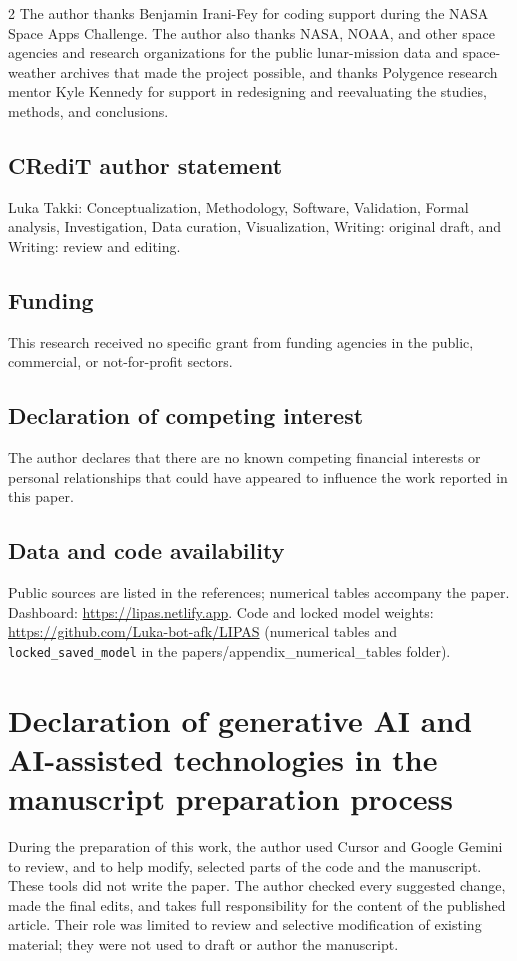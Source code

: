 \begin{multicols}{2}
The author thanks Benjamin Irani-Fey for coding support during the NASA Space Apps Challenge. The author also thanks NASA, NOAA, and other space agencies and research organizations for the public lunar-mission data and space-weather archives that made the project possible, and thanks Polygence research mentor Kyle Kennedy for support in redesigning and reevaluating the studies, methods, and conclusions.

\subsection*{CRediT author statement}
Luka Takki: Conceptualization, Methodology, Software, Validation, Formal analysis, Investigation, Data curation, Visualization, Writing: original draft, and Writing: review and editing.

\subsection*{Funding}
This research received no specific grant from funding agencies in the public, commercial, or not-for-profit sectors.

\subsection*{Declaration of competing interest}
The author declares that there are no known competing financial interests or personal relationships that could have appeared to influence the work reported in this paper.

\subsection*{Data and code availability}
Public sources are listed in the references; numerical tables accompany the paper. Dashboard: \url{https://lipas.netlify.app}. Code and locked model weights: \url{https://github.com/Luka-bot-afk/LIPAS} (numerical tables and \texttt{locked\_saved\_model} in the papers/appendix\_numerical\_tables folder).

\section*{Declaration of generative AI and AI-assisted technologies in the manuscript preparation process}

During the preparation of this work, the author used Cursor and Google Gemini to review, and to help modify, selected parts of the code and the manuscript. These tools did not write the paper. The author checked every suggested change, made the final edits, and takes full responsibility for the content of the published article. Their role was limited to review and selective modification of existing material; they were not used to draft or author the manuscript. 


\end{multicols}

